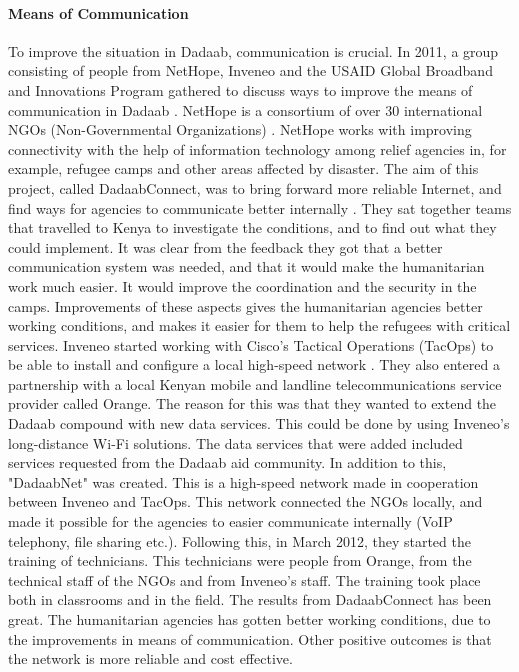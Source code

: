 \paragraph{Means of Communication}
To improve the situation in Dadaab, communication is crucial. In 2011, a group consisting of people from NetHope, Inveneo and the USAID Global Broadband and Innovations Program gathered to discuss ways to improve the means of communication in Dadaab \cite{dadaab}. NetHope is a consortium of over 30 international NGOs (Non-Governmental Organizations) \cite{nethope}. NetHope works with improving connectivity with the help of information technology among relief agencies in, for example, refugee camps and other areas affected by disaster. The aim of this project, called DadaabConnect, was to bring forward more reliable Internet, and find ways for agencies to communicate better internally \cite{dadaab}. They sat together teams that travelled to Kenya to investigate the conditions, and to find out what they could implement. It was clear from the feedback they got that a better communication system was needed, and that it would make the humanitarian work much easier. It would improve the coordination and the security in the camps. Improvements of these aspects gives the humanitarian agencies better working conditions, and makes it easier for them to help the refugees with critical services. Inveneo started working with Cisco's Tactical Operations (TacOps) to be able to install and configure a local high-speed network \cite{dadaabinveneo}. They also entered a partnership with a local Kenyan mobile and landline telecommunications service provider called Orange. The reason for this was that they wanted to extend the Dadaab compound with new data services. This could be done by using Inveneo's long-distance Wi-Fi solutions. The data services that were added included services requested from the Dadaab aid community. In addition to this, "DadaabNet" was created. This is a high-speed network made in cooperation between Inveneo and TacOps. This network connected the NGOs locally, and made it possible for the agencies to easier communicate internally (VoIP telephony, file sharing etc.). Following this, in March 2012, they started the training of technicians. This technicians were people from Orange, from the technical staff of the NGOs and from Inveneo's staff. The training took place both in classrooms and in the field. The results from DadaabConnect has been great. The humanitarian agencies has gotten better working conditions, due to the improvements in means of communication. Other positive outcomes is that the network is more reliable and cost effective. 


